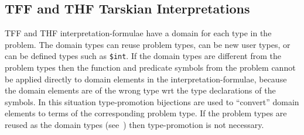 \documentclass{easychair}
\begin{document}
\subsection{TFF and THF Tarskian Interpretations}
\label{NewTarskianTFFTHF}

TFF and THF interpretation-formulae have a domain for each type in the problem.
The domain types can reuse problem types, can be new user types, or can be defined types
such as {\tt \$int}.
If the domain types are different from the problem types then the function and predicate symbols 
from the problem cannot be applied directly to domain elements in the interpretation-formulae, 
because the domain elements are of the wrong type wrt the type declarations of the symbols.
In this situation type-promotion bijections are used to ``convert'' domain elements to 
terms of the corresponding problem type.
If the problem types are reused as the domain types (see~\cite[\S5.3.4]{Gal15}) then
type-promotion is not necessary.
\end{document}
